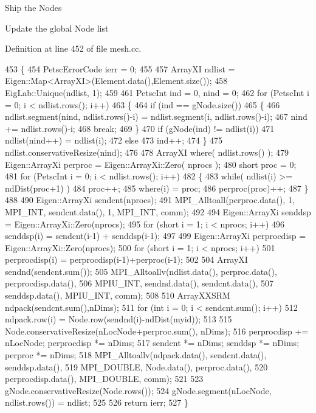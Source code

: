 Ship the Nodes

Update the global Node list 

Definition at line 452 of file mesh.\+cc.


\begin{DoxyCode}
453 \{
454   PetscErrorCode ierr = 0;
455 
457   ArrayXI ndlist = Eigen::Map<ArrayXI>(Element.data(),Element.size());
458   EigLab::Unique(ndlist, 1);
459 
461   PetscInt ind = 0, nind = 0;
462   \textcolor{keywordflow}{for} (PetscInt i = 0; i < ndlist.rows(); i++)
463   \{
464       \textcolor{keywordflow}{if} (ind == gNode.size())
465       \{
466           ndlist.segment(nind, ndlist.rows()-i) = ndlist.segment(i, ndlist.rows()-i);
467           nind += ndlist.rows()-i;
468           \textcolor{keywordflow}{break};
469       \}
470       \textcolor{keywordflow}{if} (gNode(ind) != ndlist(i))
471           ndlist(nind++) = ndlist(i);
472       \textcolor{keywordflow}{else}
473           ind++;
474   \}
475   ndlist.conservativeResize(nind);
476 
478   ArrayXI where( ndlist.rows() );
479   Eigen::ArrayXi perproc = Eigen::ArrayXi::Zero( nprocs );
480   \textcolor{keywordtype}{short} proc = 0;
481   \textcolor{keywordflow}{for} (PetscInt i = 0; i < ndlist.rows(); i++)
482   \{
483       \textcolor{keywordflow}{while}( ndlist(i) >= ndDist(proc+1) )
484           proc++;
485       where(i) = proc;
486       perproc(proc)++;
487   \}
488 
490   Eigen::ArrayXi sendcnt(nprocs);
491   MPI\_Alltoall(perproc.data(), 1, MPI\_INT, sendcnt.data(), 1, MPI\_INT, comm);
492 
494   Eigen::ArrayXi senddsp = Eigen::ArrayXi::Zero(nprocs);
495   \textcolor{keywordflow}{for} (\textcolor{keywordtype}{short} i = 1; i < nprocs; i++)
496       senddsp(i) = sendcnt(i-1) + senddsp(i-1);
497 
499   Eigen::ArrayXi perprocdisp = Eigen::ArrayXi::Zero(nprocs);
500   \textcolor{keywordflow}{for} (\textcolor{keywordtype}{short} i = 1; i < nprocs; i++)
501       perprocdisp(i) = perprocdisp(i-1)+perproc(i-1);
502 
504   ArrayXI sendnd(sendcnt.sum());
505   MPI\_Alltoallv(ndlist.data(), perproc.data(), perprocdisp.data(),
506                 MPIU\_INT, sendnd.data(), sendcnt.data(),
507                 senddsp.data(), MPIU\_INT, comm);
508 
510   ArrayXXSRM ndpack(sendcnt.sum(),nDims);
511   \textcolor{keywordflow}{for} (\textcolor{keywordtype}{int} i = 0; i < sendcnt.sum(); i++)
512       ndpack.row(i) = Node.row(sendnd(i)-ndDist(myid));
513 
515   Node.conservativeResize(nLocNode+perproc.sum(), nDims);
516   perprocdisp += nLocNode; perprocdisp *= nDims;
517   sendcnt *= nDims; senddsp *= nDims; perproc *= nDims;
518   MPI\_Alltoallv(ndpack.data(), sendcnt.data(), senddsp.data(),
519                 MPI\_DOUBLE, Node.data(), perproc.data(),
520                 perprocdisp.data(), MPI\_DOUBLE, comm);
521 
523   gNode.conservativeResize(Node.rows());
524   gNode.segment(nLocNode, ndlist.rows()) = ndlist;
525 
526   \textcolor{keywordflow}{return} ierr;
527 \}
\end{DoxyCode}
\mbox{\label{class_mesh_af9e180bd8adb9c495e6c38840ea19f10}} 

